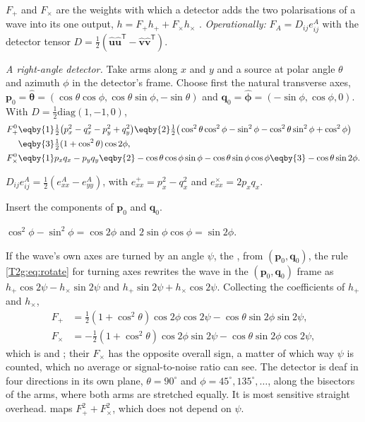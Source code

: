 \begin{workdef}
$F_+$ and $F_\times$ are the weights with which a detector adds the two polarisations of a wave into its one output, $h=F_+h_++F_\times h_\times$ . \emph{Operationally:} $F_A=D_{ij}e^A_{ij}$ with the detector tensor $D=\tfrac12(\hat{\bm u}\hat{\bm u}^{\mathsf T}-\hat{\bm v}\hat{\bm v}^{\mathsf T})$.
\end{workdef}

\emph{A right-angle detector.} Take arms along $x$ and $y$ and a source at polar angle $\theta$ and azimuth $\phi$ in the detector's frame. Choose first the natural transverse axes, $\bm p_0=\hat{\bm\theta}=(\cos\theta\cos\phi,\cos\theta\sin\phi,-\sin\theta)$ and $\bm q_0=\hat{\bm\phi}=(-\sin\phi,\cos\phi,0)$. With $D=\tfrac12\mathrm{diag}(1,-1,0)$,
\begin{align}
  F_+^0&\eqby{1}\tfrac12\big(p_x^2-q_x^2-p_y^2+q_y^2\big)
  \eqby{2}\tfrac12\big(\cos^2\theta\cos^2\phi-\sin^2\phi-\cos^2\theta\sin^2\phi+\cos^2\phi\big)\nonumber\\
  &\eqby{3}\tfrac12(1+\cos^2\theta)\cos2\phi,\nonumber\\
  F_\times^0&\eqby{1}p_xq_x-p_yq_y
  \eqby{2}-\cos\theta\cos\phi\sin\phi-\cos\theta\sin\phi\cos\phi
  \eqby{3}-\cos\theta\sin2\phi .
\end{align}
\begin{explain}
  \item $D_{ij}e^A_{ij}=\tfrac12(e^A_{xx}-e^A_{yy})$, with $e^+_{xx}=p_x^2-q_x^2$ and $e^\times_{xx}=2p_xq_x$.
  \item Insert the components of $\bm p_0$ and $\bm q_0$.
  \item $\cos^2\phi-\sin^2\phi=\cos2\phi$ and $2\sin\phi\cos\phi=\sin2\phi$.
\end{explain}
If the wave's own axes are turned by an angle $\psi$, the , from $(\bm p_0,\bm q_0)$, the rule \eqref{T2g:eq:rotate} for turning axes rewrites the wave in the $(\bm p_0,\bm q_0)$ frame as $h_+\cos2\psi-h_\times\sin2\psi$ and $h_+\sin2\psi+h_\times\cos2\psi$. Collecting the coefficients of $h_+$ and $h_\times$,
\begin{equation}
\begin{aligned}
  F_+&=\tfrac12(1+\cos^2\theta)\cos2\phi\cos2\psi-\cos\theta\sin2\phi\sin2\psi,\\
  F_\times&=-\tfrac12(1+\cos^2\theta)\cos2\phi\sin2\psi-\cos\theta\sin2\phi\cos2\psi,
\end{aligned}
  \label{T2g:eq:Fplus}
\end{equation}
which is \cite[eq.~(6)]{Robson2019} and \cite[eq.~(15a)]{BarackCutler2004}; their $F_\times$ has the opposite overall sign, a matter of which way $\psi$ is counted, which no average or signal-to-noise ratio can see. The detector is deaf in four directions in its own plane, $\theta=90^\circ$ and $\phi=45^\circ,135^\circ,\dots$, along the bisectors of the arms, where both arms are stretched equally. It is most sensitive straight overhead.  maps $F_+^2+F_\times^2$, which does not depend on $\psi$.

